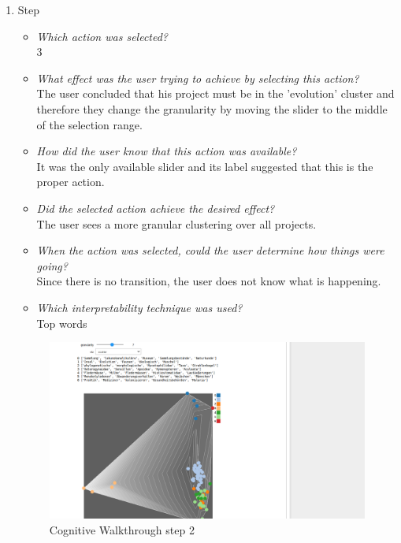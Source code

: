 {\begin{enumerate}
		\item Step
		\begin{itemize}
			\item \textit{Which action was selected?} \\
			3
			\item \textit{What effect was the user trying to achieve by selecting this action?} \\
			The user concluded that his project must be in the 'evolution' cluster and therefore they change the granularity by moving the slider to the middle of the selection range. 
			\item \textit{How did the user know that this action was available?} \\
			It was the only available slider and its label suggested that this is the proper action. 
			\item \textit{Did the selected action achieve the desired effect?} \\
			The user sees a more granular clustering over all projects. 
			\item \textit{When the action was selected, could the user determine how things were going?} \\
			Since there is no transition, the user does not know what is happening.
			\item \textit{Which interpretability technique was used?}\\
			Top words
		\end{itemize}
		\begin{figure}[H]
			\centering
			\includegraphics[width=400px]{../chapters/validation/pics/2_c}
			\caption{\label{pic:step2} Cognitive Walkthrough step 2}
		\end{figure} \newpage
		

\end{enumerate}}
